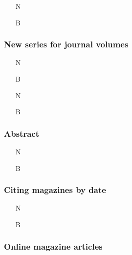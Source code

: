 \documentclass[11pt,letterpaper,oneside]{article}
\begin{document}
\begin{itemize}
\item[N] 

\item[B] 
\end{itemize}

\setcounter{subsubsection}{194}
\subsubsection{New series for journal volumes}
\label{14.195}

\begin{itemize}
\item[N] 

\item[B] 

\item[N] 

\item[B] 
\end{itemize}

\setcounter{subsubsection}{196}
\subsubsection{Abstract}

\begin{itemize}
\item[N] 

\item[B] 
\end{itemize}

\setcounter{subsubsection}{198}
\subsubsection{Citing magazines by date}

\begin{itemize}
\item[N] 

\item[B] 
\end{itemize}

\subsubsection{Online magazine articles}
\end{document}
